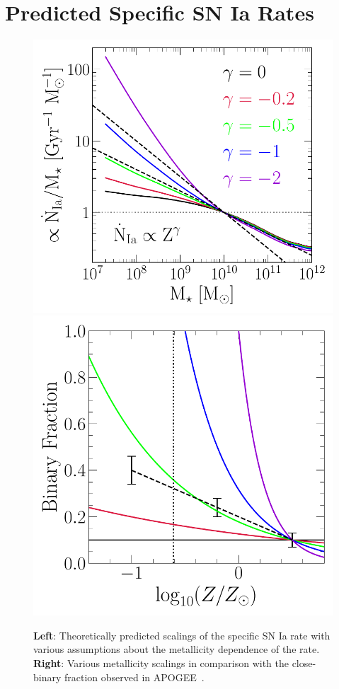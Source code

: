 \documentclass[ms.tex]{subfiles}
\begin{document}
\section{Predicted Specific SN Ia Rates}
\label{sec:predictions}

\begin{figure}
\centering
\includegraphics[scale = 0.55]{umachine_iarate_metdep.pdf}
\includegraphics[scale = 0.56]{binaries_zscaling.pdf}
\caption{
\textbf{Left}: Theoretically predicted scalings of the specific SN Ia rate with
various assumptions about the metallicity dependence of the rate.
\textbf{Right}: Various metallicity scalings in comparison with the
close-binary fraction observed in APOGEE~\citep{Moe2019}.
}
\label{fig:specia_metdep}
\end{figure}
\end{document}
